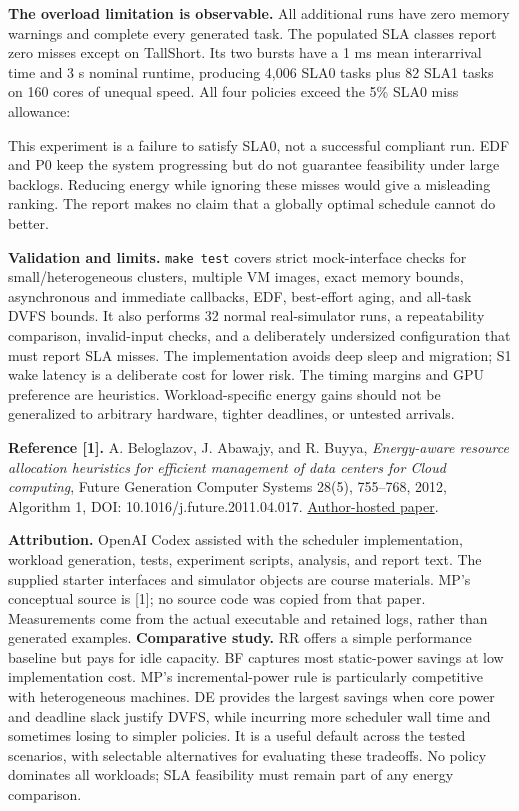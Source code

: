 \documentclass[10pt,letterpaper]{article}
\begin{document}
\textbf{The overload limitation is observable.} All additional runs have zero
memory warnings and complete every generated task. The populated SLA classes
report zero misses except on TallShort. Its two bursts have a 1 ms mean interarrival
time and 3 s nominal runtime, producing 4,006 SLA0 tasks plus 82 SLA1 tasks on 160
cores of unequal speed. All four policies exceed the 5\% SLA0 miss allowance:
\begin{center}
\small

\end{center}
This experiment is a failure to satisfy SLA0, not a successful compliant run.
EDF and P0 keep the system progressing but do not guarantee feasibility under
large backlogs. Reducing energy while ignoring these misses would give a misleading
ranking. The report makes no claim that a globally optimal schedule cannot do better.

\textbf{Validation and limits.} \texttt{make test} covers strict mock-interface
checks for small/heterogeneous clusters, multiple VM images, exact memory bounds,
asynchronous and immediate callbacks, EDF, best-effort aging, and all-task DVFS
bounds. It also performs 32 normal real-simulator runs, a repeatability comparison,
invalid-input checks, and a deliberately undersized configuration that must report
SLA misses. The implementation avoids deep sleep and migration; S1 wake latency
is a deliberate cost for lower risk. The timing margins and GPU preference are
heuristics. Workload-specific energy gains should not be generalized to arbitrary
hardware, tighter deadlines, or untested arrivals.

\small
\textbf{Reference [1].} A. Beloglazov, J. Abawajy, and R. Buyya,
\emph{Energy-aware resource allocation heuristics for efficient management of data
centers for Cloud computing}, Future Generation Computer Systems 28(5), 755--768,
2012, Algorithm 1, DOI: 10.1016/j.future.2011.04.017.
\href{https://clouds.cis.unimelb.edu.au/papers/Energy-Aware-CloudResourceAllocation-FGCS2012.pdf}{Author-hosted paper}.

\textbf{Attribution.} OpenAI Codex assisted with the scheduler implementation,
workload generation, tests, experiment scripts, analysis, and report text. The
supplied starter interfaces and simulator objects are course materials. MP's
conceptual source is [1]; no source code was copied from that paper. Measurements
come from the actual executable and retained logs, rather than generated examples.
\textbf{Comparative study.} RR offers a simple performance baseline but pays for
idle capacity. BF captures most static-power savings at low implementation cost.
MP's incremental-power rule is particularly competitive with heterogeneous machines.
DE provides the largest savings when core power and deadline slack justify DVFS,
while incurring more scheduler wall time and sometimes losing to simpler policies.
It is a useful default across the tested scenarios, with selectable alternatives
for evaluating these tradeoffs. No policy dominates all workloads; SLA feasibility
must remain part of any energy comparison.
\end{document}
